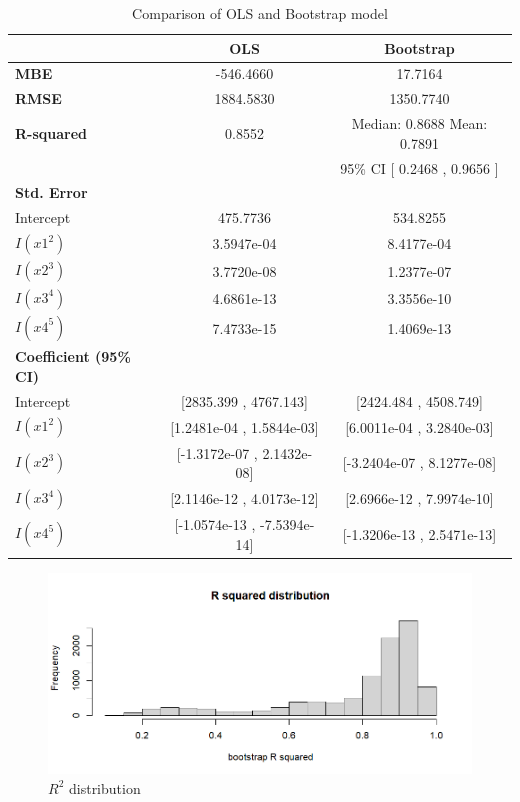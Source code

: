 \begin{table}[h!]
	\centering
	\caption{Comparison of OLS and Bootstrap model}
	\begin{tabular}{lcc}
		\hline
		& \textbf{OLS} & \textbf{Bootstrap} \\
		\hline
		\textbf{MBE} & -546.4660 & 17.7164 \\
		\textbf{RMSE} & 1884.5830 & 1350.7740 \\
		\textbf{R-squared} & 0.8552 & Median: 0.8688 Mean: 0.7891  \\
		& & 95\% CI [ 0.2468 ,  0.9656 ] \\
		\hline
		\textbf{Std. Error} \\
		\hline
		Intercept & 475.7736 & 534.8255 \\
		$I(x1^2)$ & 3.5947e-04 & 8.4177e-04 \\
		$I(x2^3)$ & 3.7720e-08 & 1.2377e-07 \\
		$I(x3^4)$ & 4.6861e-13 & 3.3556e-10 \\
		$I(x4^5)$ & 7.4733e-15 & 1.4069e-13 \\
		\hline
		\textbf{Coefficient (95\% CI)} \\
		\hline
		Intercept & [2835.399 , 4767.143] & [2424.484 , 4508.749] \\
		$I(x1^2)$ & [1.2481e-04 , 1.5844e-03] & [6.0011e-04 , 3.2840e-03] \\
		$I(x2^3)$ & [-1.3172e-07 , 2.1432e-08] & [-3.2404e-07 , 8.1277e-08] \\
		$I(x3^4)$ & [2.1146e-12 , 4.0173e-12] & [2.6966e-12 , 7.9974e-10] \\
		$I(x4^5)$ & [-1.0574e-13 , -7.5394e-14] & [-1.3206e-13 , 2.5471e-13] \\
		\hline
	\end{tabular}
\end{table}


\begin{figure}[h]
	\includegraphics[width=\linewidth]{billder/R^2v2.png}
	\caption{$R^2$ distribution}
	\label{fig:5}
\end{figure}

